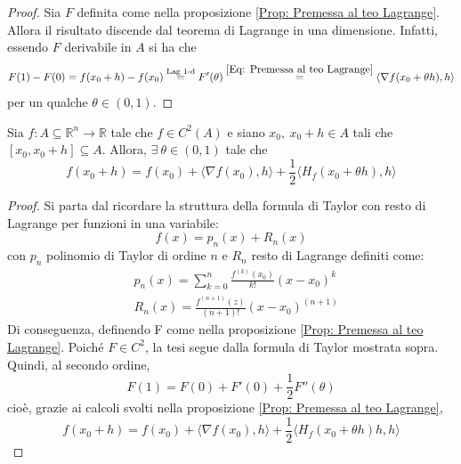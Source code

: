     \begin{proof}
        Sia $F$ definita come nella proposizione \ref{Prop: Premessa al teo Lagrange}. Allora il risultato discende dal teorema di Lagrange in una dimensione. Infatti, essendo $F$ derivabile in $A$ si ha che
        \begin{equation}
            F(1)-F(0)=f(x_0+h)-f(x_0)\overset{\text{Lag 1-d}}{=}F'(\theta)\overset{\eqref{Eq: Premessa al teo Lagrange}}{=}\langle \nabla f(x_0+ \theta h), h \rangle
        \end{equation}
        per un qualche $\theta \in (0,1)$.
    \end{proof} 
\begin{theorem} \label{Teo: Taylor con resto di Lagrange}
    Sia $f:A \subseteq \mathbb{R}^n \to \mathbb{R}$ tale che $f\in C^2(A)$ e siano $x_0,\ x_0+h \in A$ tali che $[x_0, x_0+h] \subseteq A$. Allora, $\exists\ \theta \in (0,1)$ tale che
    \begin{equation}
        f(x_0+h)=f(x_0)+ \langle \nabla f(x_0), h \rangle + \frac{1}{2}\langle H_f(x_0+\theta h),h \rangle 
    \end{equation} 
\end{theorem}
    \begin{proof}
        Si parta dal ricordare la struttura della formula di Taylor con resto di Lagrange per funzioni in una variabile:
        \begin{equation}
            f(x)=p_n(x)+R_n(x)
        \end{equation}
        con $p_n$ polinomio di Taylor di ordine $n$ e $R_n$ resto di Lagrange definiti come:
        \begin{equation}
            \begin{aligned}
                &p_n(x)=\sum\limits_{k=0}^{n}{\frac{f^{(k)}(x_0)}{k!}(x-x_0)^k}\\
                &R_n(x)=\frac{f^{(n+1)}(z)}{(n+1)!}(x-x_0)^{(n+1)}
            \end{aligned}
        \end{equation}
        Di conseguenza, definendo F come nella proposizione \ref{Prop: Premessa al teo Lagrange}. Poiché $F \in C^2$, la tesi segue dalla formula di Taylor mostrata sopra.
        Quindi, al secondo ordine, 
        \begin{equation}
            F(1)=F(0)+F'(0)+\frac{1}{2}F''(\theta)
        \end{equation}
        cioè, grazie ai calcoli svolti nella proposizione \ref{Prop: Premessa al teo Lagrange}, 
        \begin{equation}
            f(x_0+h)= f(x_0)+\langle \nabla f(x_0), h \rangle + \frac{1}{2}\langle H_f(x_0+ \theta h)h, h\rangle
        \end{equation}
    \end{proof}
